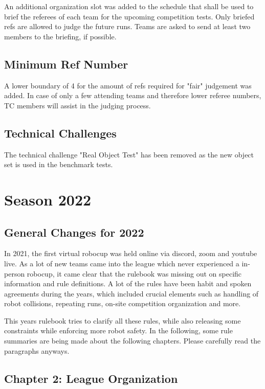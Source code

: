An additional organization slot was added to the schedule that shall be used to brief the referees of each team for the upcoming competition tests. Only briefed refs are allowed to judge the future runs.
Teams are asked to send at least two members to the briefing, if possible.

\subsection{Minimum Ref Number}

A lower boundary of 4 for the amount of refs required for "fair" judgement was added.
In case of only a few attending teams and therefore lower referee numbers,
TC members will assist in the judging process.

\subsection{Technical Challenges}

The technical challenge "Real Object Test" has been removed as the new object set is used in the benchmark tests.



\section{Season 2022}

\subsection{General Changes for 2022}

In 2021, the first virtual robocup was held online via discord, zoom and youtube live.
As a lot of new teams came into the league which never experienced a in-person robocup,
it came clear that the rulebook was missing out on specific information and rule definitions.
A lot of the rules have been habit and spoken agreements during the years,
which included crucial elements such as handling of robot collisions, repeating runs,
on-site competition organization and more.

This years rulebook tries to clarify all these rules, while also releasing some constraints 
while enforcing more robot safety. In the following, 
some rule summaries are being made about the following chapters.
Please carefully read the paragraphs anyways.

\subsection{Chapter 2: League Organization}

